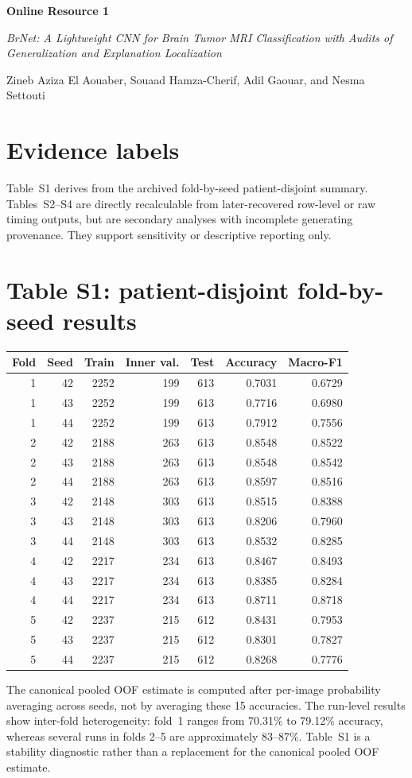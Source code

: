 \documentclass[10pt]{article}
\begin{document}
\begin{center}
{\Large\bfseries Online Resource 1}\par
\textit{BrNet: A Lightweight CNN for Brain Tumor MRI Classification with Audits of Generalization and Explanation Localization}\par
Zineb Aziza El Aouaber, Souaad Hamza-Cherif, Adil Gaouar, and Nesma Settouti
\end{center}

\section*{Evidence labels}
Table~S1 derives from the archived fold-by-seed patient-disjoint summary. Tables~S2--S4 are directly recalculable from later-recovered row-level or raw timing outputs, but are secondary analyses with incomplete generating provenance. They support sensitivity or descriptive reporting only.

\section*{Table S1: patient-disjoint fold-by-seed results}
\begin{longtable}{rrrrrrr}
\toprule
Fold & Seed & Train & Inner val. & Test & Accuracy & Macro-F1 \\
\midrule
1&42&2252&199&613&0.7031&0.6729\\
1&43&2252&199&613&0.7716&0.6980\\
1&44&2252&199&613&0.7912&0.7556\\
2&42&2188&263&613&0.8548&0.8522\\
2&43&2188&263&613&0.8548&0.8542\\
2&44&2188&263&613&0.8597&0.8516\\
3&42&2148&303&613&0.8515&0.8388\\
3&43&2148&303&613&0.8206&0.7960\\
3&44&2148&303&613&0.8532&0.8285\\
4&42&2217&234&613&0.8467&0.8493\\
4&43&2217&234&613&0.8385&0.8284\\
4&44&2217&234&613&0.8711&0.8718\\
5&42&2237&215&612&0.8431&0.7953\\
5&43&2237&215&612&0.8301&0.7827\\
5&44&2237&215&612&0.8268&0.7776\\
\bottomrule
\end{longtable}
The canonical pooled OOF estimate is computed after per-image probability averaging across seeds, not by averaging these 15 accuracies.
The run-level results show inter-fold heterogeneity: fold~1 ranges from 70.31\% to 79.12\% accuracy, whereas several runs in folds 2--5 are approximately 83--87\%. Table~S1 is a stability diagnostic rather than a replacement for the canonical pooled OOF estimate.
\end{document}
